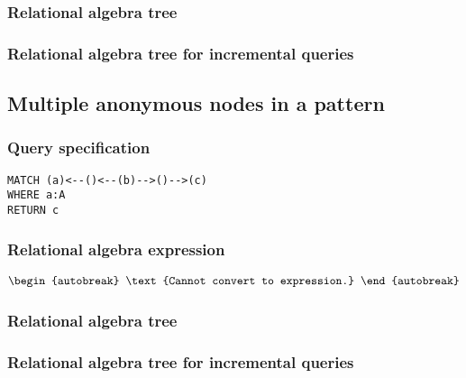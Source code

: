 \subsubsection*{Relational algebra tree}


\subsubsection*{Relational algebra tree for incremental queries}


\subsection{Multiple anonymous nodes in a pattern}

\subsubsection*{Query specification}

\begin{lstlisting}
MATCH (a)<--()<--(b)-->()-->(c)
WHERE a:A
RETURN c
\end{lstlisting}

\subsubsection*{Relational algebra expression}

\begin{align*}
\begin{autobreak}
\text{Cannot convert to expression.}
\end{autobreak}
\end{align*}

\subsubsection*{Relational algebra tree}


\subsubsection*{Relational algebra tree for incremental queries}


